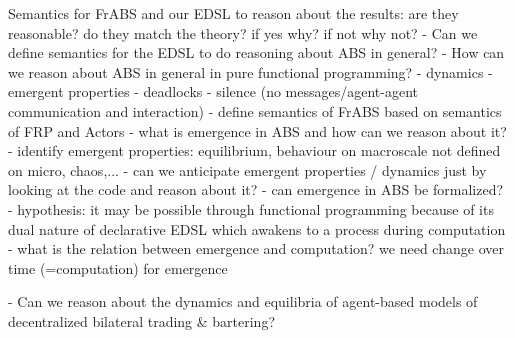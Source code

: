 Semantics for FrABS and our EDSL to reason about the results: are they reasonable? do they match the theory? if yes why? if not why not?
	- Can we define semantics for the EDSL to do reasoning about ABS in general?
	- How can we reason about ABS in general in pure functional programming?
		- dynamics
		- emergent properties
		- deadlocks
		- silence (no messages/agent-agent communication and interaction)
		- define semantics of FrABS based on semantics of FRP and Actors
		- what is emergence in ABS and how can we reason about it? 
			- identify emergent properties: equilibrium, behaviour on macroscale not defined on micro, chaos,...
			- can we anticipate emergent properties / dynamics just by looking at the code and reason about it?
			- can emergence in ABS be formalized?
				- hypothesis: it may be possible through functional programming because of its dual nature of declarative EDSL which awakens to a process during computation
					- what is the relation between emergence and computation? we need change over time (=computation) for emergence
					
		- Can we reason about the dynamics and equilibria of agent-based models of decentralized bilateral trading \& bartering?